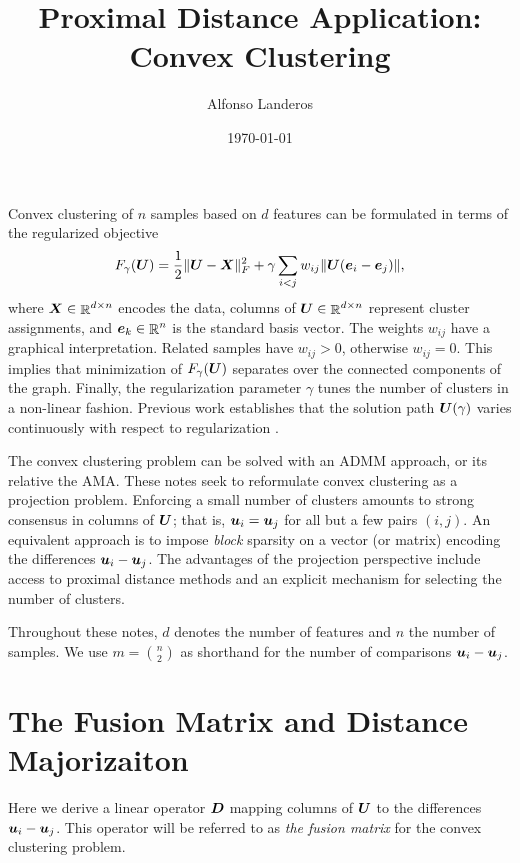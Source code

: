 \documentclass[11pt]{article}
\title{Proximal Distance Application: Convex Clustering}
\author{Alfonso Landeros}
\date{\today}
\begin{document}
\maketitle

Convex clustering of \(n\) samples based on \(d\) features can be formulated in terms of the regularized objective
\begin{equation}
    \label{eq:regularized-objective}
    F_{\gamma}(\boldsymbol{U})
    =
    \frac{1}{2} \|\boldsymbol{U} - \boldsymbol{X}\|_{F}^{2}
    +
    \gamma \sum_{i < j} w_{ij} \|\boldsymbol{U} (\boldsymbol{e}_{i} - \boldsymbol{e}_{j})\|,
\end{equation}
where \(\boldsymbol{X} \in \mathop{\mathbb{R}}\nolimits^{d \times n}\) encodes the data, columns of \(\boldsymbol{U} \in \mathop{\mathbb{R}}\nolimits^{d \times n}\) represent cluster assignments, and \(\boldsymbol{e}_{k} \in \mathop{\mathbb{R}}\nolimits^{n}\) is the standard basis vector.
The weights \(w_{ij}\) have a graphical interpretation.
Related samples have \(w_{ij} > 0\), otherwise \(w_{ij} = 0\).
This implies that minimization of \(F_{\gamma}(\boldsymbol{U})\) separates over the connected components of the graph.
Finally, the regularization parameter \(\gamma\) tunes the number of clusters in a non-linear fashion.
Previous work establishes that the solution path \(\boldsymbol{U}(\gamma)\) varies continuously with respect to regularization \cite{chi2015}.

The convex clustering problem can be solved with an ADMM approach, or its relative the AMA.
These notes seek to reformulate convex clustering as a projection problem.
Enforcing a small number of clusters amounts to strong consensus in columns of \(\boldsymbol{U}\); that is, \(\boldsymbol{u}_{i} = \boldsymbol{u}_{j}\) for all but a few pairs \((i,j)\).
An equivalent approach is to impose \textit{block} sparsity on a vector (or matrix) encoding the differences \(\boldsymbol{u}_{i} - \boldsymbol{u}_{j}\).
The advantages of the projection perspective include access to proximal distance methods and an explicit mechanism for selecting the number of clusters.

Throughout these notes, \(d\) denotes the number of features and \(n\) the number of samples.
We use \(m = \binom{n}{2}\) as shorthand for the number of comparisons \(\boldsymbol{u}_{i} - \boldsymbol{u}_{j}\).

\section*{\center The Fusion Matrix and Distance Majorizaiton}

Here we derive a linear operator \(\boldsymbol{D}\) mapping columns of \(\boldsymbol{U}\) to the differences \(\boldsymbol{u}_{i} - \boldsymbol{u}_{j}\).
This operator will be referred to as \textit{the fusion matrix} for the convex clustering problem.
\end{document}
